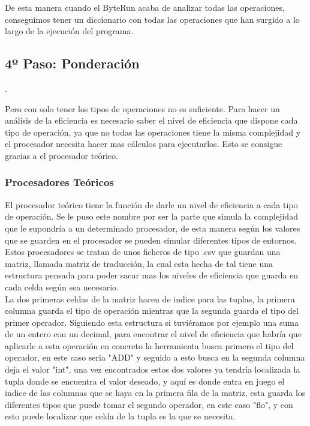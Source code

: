 De esta manera cuando el ByteRun acaba de analizar todas las operaciones, conseguimos tener un diccionario con todas las operaciones que han surgido a lo largo de la ejecución del programa.\\

\subsection{4º Paso: Ponderación}.

Pero con solo tener los tipos de operaciones no es suficiente. Para hacer un análisis de la eficiencia es necesario saber el nivel de eficiencia que dispone cada tipo de operación, ya que no todas las operaciones tiene la misma complejidad y el procesador necesita hacer mas cálculos para ejecutarlos. Esto se consigue gracias a el procesador teórico.\\

\subsubsection{Procesadores Teóricos}
El procesador teórico tiene la función de darle un nivel de eficiencia a cada tipo de operación. Se le puso este nombre por ser la parte que simula la complejidad que le supondría a un determinado procesador, de esta manera según los valores que se guarden en el procesador se pueden simular diferentes tipos de entornos.\\

Estos procesadores se tratan de unos ficheros de tipo .csv que guardan una matriz, llamada matriz de traducción, la cual esta hecha de tal tiene una estructura pensada para poder sacar mas los  niveles de eficiencia  que guarda en cada celda según sea necesario.\\

La dos primeras celdas de la matriz hacen de indice para las tuplas, la primera columna guarda el tipo de operación mientras que la segunda guarda el tipo del primer operador. Siguiendo esta estructura si tuviéramos por ejemplo una suma de un entero con un decimal, para encontrar el nivel de eficiencia que habría que aplicarle a esta operación en concreto la herramienta busca primero el tipo del operador, en este caso seria "ADD" y seguido a  esto busca en la segunda columna deja el valor "int", una vez  encontrados  estos dos valores ya tendría localizada la tupla donde se encuentra  el valor  deseado, y aquí es donde  entra en juego el indice de las  columnas que se haya en la primera fila de la matriz, esta  guarda los diferentes tipos que puede tomar el segundo operador, en este caso "flo", y con esto puede localizar que celda de la tupla es la que se necesita.

